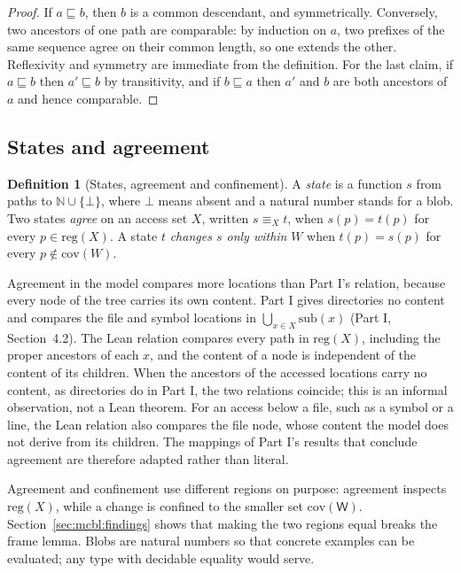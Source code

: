 \documentclass[11pt,letterpaper]{article}
\theoremstyle{definition}
\newtheorem{definition}[theorem]{Definition}
\theoremstyle{remark}
\newcommand{\W}{\mathsf{W}}
\newcommand{\cov}{\sqsubseteq}
\newcommand{\op}[1]{\mathrm{#1}}
\newcommand{\covd}{\op{cov}}
\newcommand{\reg}{\op{reg}}
\begin{document}
\begin{proof}
If $a\cov b$, then $b$ is a common descendant, and symmetrically. Conversely, two ancestors of one path are comparable: by induction on $a$, two prefixes of the same sequence agree on their common length, so one extends the other. Reflexivity and symmetry are immediate from the definition. For the last claim, if $a\cov b$ then $a'\cov b$ by transitivity, and if $b\cov a$ then $a'$ and $b$ are both ancestors of $a$ and hence comparable.
\end{proof}

\subsection{States and agreement}

\begin{definition}[States, agreement and confinement]
\label{def:mcbl:state}
A \emph{state} is a function $s$ from paths to $\mathbb{N}\cup\{\bot\}$, where $\bot$ means absent and a natural number stands for a blob. Two states \emph{agree} on an access set $X$, written $s\equiv_X t$, when $s(p)=t(p)$ for every $p\in\reg(X)$. A state $t$ \emph{changes $s$ only within} $W$ when $t(p)=s(p)$ for every $p\notin\covd(W)$.
\end{definition}

Agreement in the model compares more locations than Part I's relation, because every node of the tree carries its own content. Part I gives directories no content and compares the file and symbol locations in $\bigcup_{x\in X}\mathrm{sub}(x)$ (Part I, Section~4.2). The Lean relation compares every path in $\reg(X)$, including the proper ancestors of each $x$, and the content of a node is independent of the content of its children. When the ancestors of the accessed locations carry no content, as directories do in Part I, the two relations coincide; this is an informal observation, not a Lean theorem. For an access below a file, such as a symbol or a line, the Lean relation also compares the file node, whose content the model does not derive from its children. The mappings of Part I's results that conclude agreement are therefore adapted rather than literal.

Agreement and confinement use different regions on purpose: agreement inspects $\reg(X)$, while a change is confined to the smaller set $\covd(\W)$. Section~\ref{sec:mcbl:findings} shows that making the two regions equal breaks the frame lemma. Blobs are natural numbers so that concrete examples can be evaluated; any type with decidable equality would serve.
\end{document}
